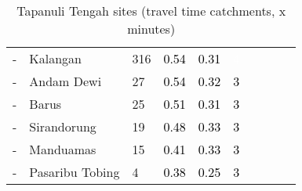 \begin{table}[ht]
\begin{tabular}{C{0.05\textwidth}C{0.15\textwidth}C{0.08\textwidth}C{0.08\textwidth}C{0.08\textwidth}C{0.08\textwidth}C{0.08\textwidth}C{0.08\textwidth}C{0.08\textwidth}C{0.08\textwidth}}
  {-} & Kalangan & 316 & \textcolor[HTML]{000000}{0.54} & \textcolor[HTML]{000000}{0.31} & \textcolor[HTML]{FFFFFF}{4} &  &  &  &  \\ 
  {-} & Andam Dewi &  27 & \textcolor[HTML]{000000}{0.54} & \textcolor[HTML]{000000}{0.32} & \textcolor[HTML]{000000}{3} &  &  &  &  \\ 
  {-} & Barus &  25 & \textcolor[HTML]{000000}{0.51} & \textcolor[HTML]{000000}{0.31} & \textcolor[HTML]{000000}{3} &  &  &  &  \\ 
  {-} & Sirandorung &  19 & \textcolor[HTML]{000000}{0.48} & \textcolor[HTML]{000000}{0.33} & \textcolor[HTML]{000000}{3} &  &  &  &  \\ 
  {-} & Manduamas &  15 & \textcolor[HTML]{000000}{0.41} & \textcolor[HTML]{000000}{0.33} & \textcolor[HTML]{000000}{3} &  &  &  &  \\ 
  {-} & Pasaribu Tobing &   4 & \textcolor[HTML]{000000}{0.38} & \textcolor[HTML]{000000}{0.25} & \textcolor[HTML]{000000}{3} &  &  &  &  \\ 
  \end{tabular}
\endgroup
\caption{Tapanuli Tengah sites (travel time catchments, x minutes)} 
\label{tab:tapanuli_tengah_time}
\end{table}
